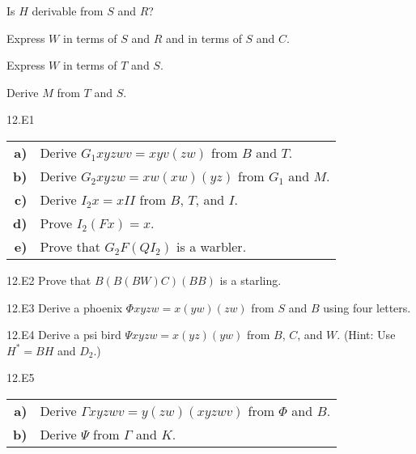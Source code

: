 \documentclass[12pt, letterpaper]{article}
\begin{document}
\begin{prob}{12.13}  
Is $H$ derivable from $S$ and $R$?
\end{prob}

\begin{prob}{12.14} 
Express $W$ in terms of $S$ and $R$ and in terms of $S$ and $C$.
\end{prob}

\begin{prob}{12.15}  
Express $W$ in terms of $T$ and $S$.
\end{prob}

\begin{prob}{12.16}  
Derive $M$ from $T$ and $S$.
\end{prob}

\begin{prob}{12.E1} 
\end{prob}

\begin{tabular}{r l}
\textbf{a)} & Derive $G_1xyzwv = xyv(zw)$ from $B$ and $T$. \\
\textbf{b)} & Derive $G_2xyzw = xw(xw)(yz)$ from $G_1$ and $M$. \\
\textbf{c)} & Derive $I_2x = xII$ from $B$, $T$, and $I$. \\
\textbf{d)} & Prove $I_2(Fx) = x$. \\
\textbf{e)} & Prove that $G_2F(QI_2)$ is a warbler.
\end{tabular}

\begin{prob}{12.E2}  
Prove that $B(B(BW)C)(BB)$ is a starling.
\end{prob}

\begin{prob}{12.E3}  
Derive a phoenix $\Phi xyzw = x(yw)(zw)$ from $S$ and $B$ using four letters.
\end{prob}

\begin{prob}{12.E4}  
Derive a psi bird $\Psi xyzw = x(yz)(yw)$ from $B$, $C$, and $W$. (Hint: Use $H^* = BH$ and $D_2$.)
\end{prob}

\begin{prob}{12.E5} 
\end{prob}
\begin{tabular}{r l}
\textbf{a)} & Derive $\Gamma xyzwv = y(zw)(xyzwv)$ from $\Phi$ and $B$. \\
\textbf{b)} & Derive $\Psi$ from $\Gamma$ and $K$.
\end{tabular}
\end{document}
